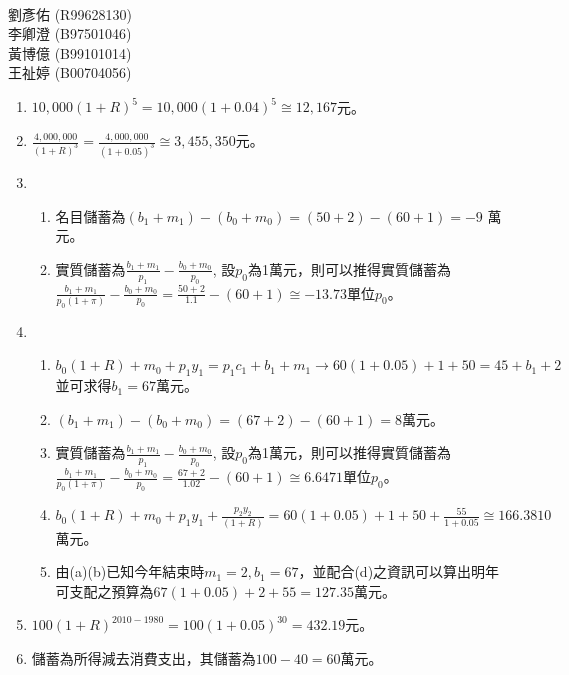 \documentclass[12pt]{article}
\begin{document}
\begin{CJK}{UTF8}{cwmb}
\renewcommand{\figurename}{圖}

\voffset=-1cm
\textwidth=5.6in
\textheight=9.2in

\newenvironment{num}
 {\leftmargini=6mm\leftmarginii=8mm
  \begin{enumerate}\itemsep=-2pt}
 {\end{enumerate}}

\newenvironment{sol}
 {\begin{quote}\mbox{}\llap{\color{blue}{解答:}\rule{10mm}{0pt}}\hspace*{-4pt}}{\end{quote}}


\thispagestyle{empty}
\fontsize{12}{20pt}\selectfont
\begin{center}
{\large{}}\\[3mm]
劉彥佑 (R99628130)\\
李卿澄 (B97501046)\\
黃博億 (B99101014)\\
王祉婷 (B00704056)
\end{center}

\begin{num}
\item $10,000(1+R)^5 = 10,000(1+0.04)^5 \cong 12,167$元。
\item $\frac{4,000,000}{(1+R)^3} = \frac{4,000,000}{(1+0.05)^3} \cong 3,455,350$元。
\item 
	\begin{num}
		\item 名目儲蓄為$(b_1+m_1)-(b_0+m_0) = (50+2)-(60+1) = -9$ 萬元。
		\item 實質儲蓄為$\frac{b_1+m_1}{p_1} - \frac{b_0+m_0}{p_0}$, 設$p_0$為1萬元，則可以推得實質儲蓄為$\frac{b_1+m_1}{p_0(1+\pi)} - \frac{b_0+m_0}{p_0} = \frac{50+2}{1.1} - (60+1) \cong -13.73$單位$p_0$。
	\end{num}
\item
	\begin{num}
		\item $b_0(1+R)+m_0+p_1y_1 = p_1c_1+b_1+m_1 \rightarrow 60(1+0.05) + 1 + 50 = 45 + b_1 + 2$ 並可求得$b_1=67$萬元。 
		\item $(b_1+m_1)-(b_0+m_0)=(67+2)-(60+1)=8$萬元。
		\item 實質儲蓄為$\frac{b_1+m_1}{p_1} - \frac{b_0+m_0}{p_0}$, 設$p_0$為1萬元，則可以推得實質儲蓄為$\frac{b_1+m_1}{p_0(1+\pi)} - \frac{b_0+m_0}{p_0} = \frac{67+2}{1.02} - (60+1) \cong 6.6471$單位$p_0$。
		\item $b_0(1+R)+m_0+p_1y_1+\frac{p_2y_2}{(1+R)} = 60(1+0.05) + 1 + 50 + \frac{55}{1+0.05} \cong 166.3810$萬元。
		\item 由(a)(b)已知今年結束時$m_1=2,b_1=67$，並配合(d)之資訊可以算出明年可支配之預算為$67(1+0.05)+2+55=127.35$萬元。
	\end{num}
\item $100(1+R)^{2010-1980}=100(1+0.05)^{30}=432.19$元。
\item 儲蓄為所得減去消費支出，其儲蓄為$100-40=60$萬元。
\end{num}

\end{CJK}
\end{document}
